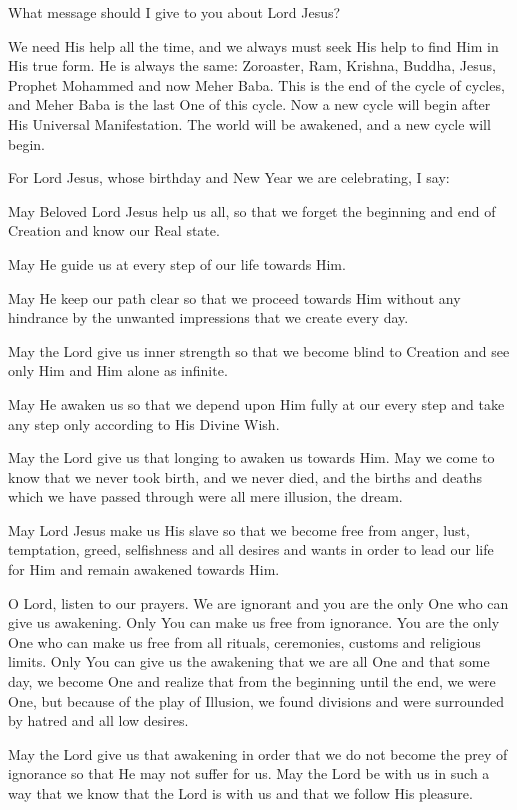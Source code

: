 What message should I give to you about Lord Jesus?

We need His help all the time, and we always must seek His help to find Him in His true form. He is always the same: Zoroaster, Ram, Krishna, Buddha, Jesus, Prophet Mohammed and now Meher Baba. This is the end of the cycle of cycles, and Meher Baba is the last One of this cycle. Now a new cycle will begin after His Universal Manifestation. The world will be awakened, and a new cycle will begin.

For Lord Jesus, whose birthday and New Year we are celebrating, I say:

May Beloved Lord Jesus help us all, so that we forget the beginning and end of Creation and know our Real state.

May He guide us at every step of our life towards Him.

May He keep our path clear so that we proceed towards Him without any hindrance by the unwanted impressions that we create every day.

May the Lord give us inner strength so that we become blind to Creation and see only Him and Him alone as infinite.

May He awaken us so that we depend upon Him fully at our every step and take any step only according to His Divine Wish.

May the Lord give us that longing to awaken us towards Him. May we come to know that we never took birth, and we never died, and the births and deaths which we have passed through were all mere illusion, the dream.

May Lord Jesus make us His slave so that we become free from anger, lust, temptation, greed, selfishness and all desires and wants in order to lead our life for Him and remain awakened towards Him.

O Lord, listen to our prayers. We are ignorant and you are the only One who can give us awakening. Only You can make us free from ignorance. You are the only One who can make us free from all rituals, ceremonies, customs and religious limits. Only You can give us the awakening that we are all One and that some day, we become One and realize that from the beginning until the end, we were One, but because of the play of Illusion, we found divisions and were surrounded by hatred and all low desires.

May the Lord give us that awakening in order that we do not become the prey of ignorance so that He may not suffer for us. May the Lord be with us in such a way that we know that the Lord is with us and that we follow His pleasure.

